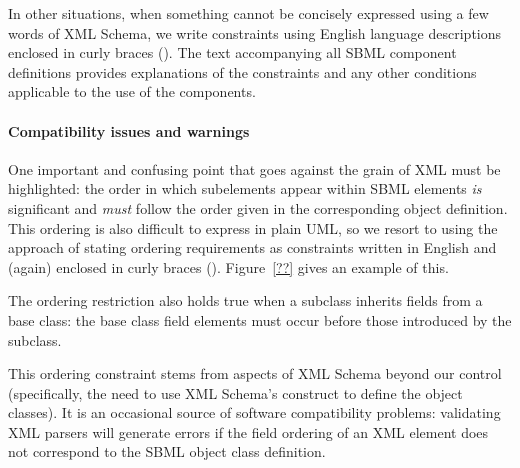 \begin{blockChanged}
In other situations, when something cannot be concisely expressed
using a few words of XML Schema, we write constraints using
English language descriptions enclosed in curly braces
(\token{\{\}}).  The text accompanying all SBML component
definitions provides explanations of the constraints and any other
conditions applicable to the use of the components.


\paragraph{Compatibility issues and warnings}

One important and confusing point that goes against the grain of
XML must be highlighted: the order in which subelements appear
within SBML elements \emph{is} significant and \emph{must} follow
the order given in the corresponding object definition.  This
ordering is also difficult to express in plain UML, so we resort
to using the approach of stating ordering requirements as
constraints written in English and (again) enclosed in curly
braces (\token{\{\}}).  Figure~\vref{??} gives an example of this.

The ordering restriction also holds true when a subclass inherits
fields from a base class: the base class field elements must occur
before those introduced by the subclass.

This ordering constraint stems from aspects of XML Schema beyond
our control (specifically, the need to use XML Schema's
 construct to define the object classes).  It is
an occasional source of software compatibility problems:
validating XML parsers will generate errors if the field ordering
of an XML element does not correspond to the SBML object class
definition.


\end{blockChanged}
